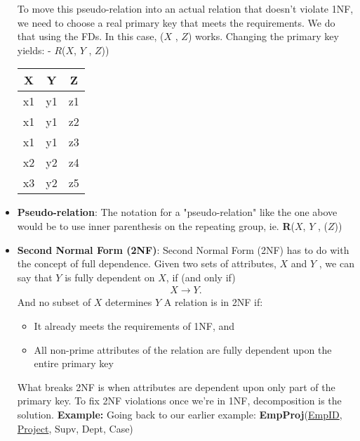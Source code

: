 \documentclass{report}
\begin{document}
\begin{itemize}
            To move this pseudo-relation into an actual relation that doesn't violate 1NF, we need to choose a real primary key that meets the requirements. We do that using the FDs. In this case, ($X$ , $Z$) works.
            \bigbreak \noindent 
            Changing the primary key yields: - $R$($X$, $Y$ , $Z$))
            \bigbreak \noindent 
            \begin{center}
                \begin{tabular}{c|c|c}
                    X  & Y  & Z  \\ \hline
                    x1 & y1 & z1 \\ \hline
                    x1 & y1 & z2 \\ \hline
                    x1 & y1 & z3 \\ \hline
                    x2 & y2 & z4 \\ \hline
                    x3 &y2 & z5 
                \end{tabular}
            \end{center}
        \item \textbf{Pseudo-relation}: The notation for a "pseudo-relation" like the one above would be to use inner parenthesis on the repeating group, ie. \textbf{R}($X$, $Y$ , ($Z$))
        \item \textbf{Second Normal Form (2NF)}: Second Normal Form (2NF) has to do with the concept of full dependence.
            \bigbreak \noindent 
            Given two sets of attributes, $X$ and $Y$ , we can say that $Y$  is fully dependent on $X$, if (and only if)
            \begin{align*}
                X \to Y
            .\end{align*}
            And no subset of $X$ determines $Y$
            \bigbreak \noindent 
            A relation is in 2NF if:
            \begin{itemize}
                \item It already meets the requirements of 1NF, and
                \item All non-prime attributes of the relation are fully dependent upon the entire primary key
            \end{itemize}
            \bigbreak \noindent 
            What breaks 2NF is when attributes are dependent upon only part of the primary key. To fix 2NF violations once we're in 1NF, decomposition is the solution.
            \bigbreak \noindent 
            \textbf{Example:} Going back to our earlier example: \textbf{EmpProj}(\underline{EmpID}, \underline{Project}, Supv, Dept, Case)

\end{itemize}
\end{document}
